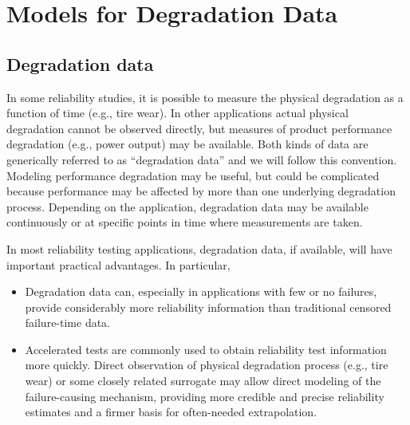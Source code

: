 \section{Models for Degradation Data}
\label{section:degrad.models}
\subsection{Degradation data}
In some reliability studies, it is possible to measure the physical
degradation as a function of time (e.g., tire wear).  In other
applications actual physical degradation cannot be observed
directly, but measures of product performance degradation (e.g.,
power output) may be available. Both kinds of data are generically
referred to as ``degradation data'' and we will follow this
convention.  Modeling performance degradation may be useful, but
could be complicated because performance may be affected by more
than one underlying degradation process.  Depending on the
application, degradation data may be available continuously or at
specific points in time where measurements are taken.


In most reliability testing applications, degradation data, if
available, will have important practical advantages. In particular,
\begin{itemize}
\item
Degradation data can, especially in
applications with few or no failures, provide
considerably more reliability information
than traditional censored failure-time data.
\item
Accelerated tests are commonly used to obtain reliability test
information more quickly.  Direct observation of physical
degradation process (e.g., tire wear) or some closely related
surrogate may allow direct modeling of the failure-causing
mechanism, providing more credible and precise reliability estimates
and a firmer basis for often-needed extrapolation.
\end{itemize}

